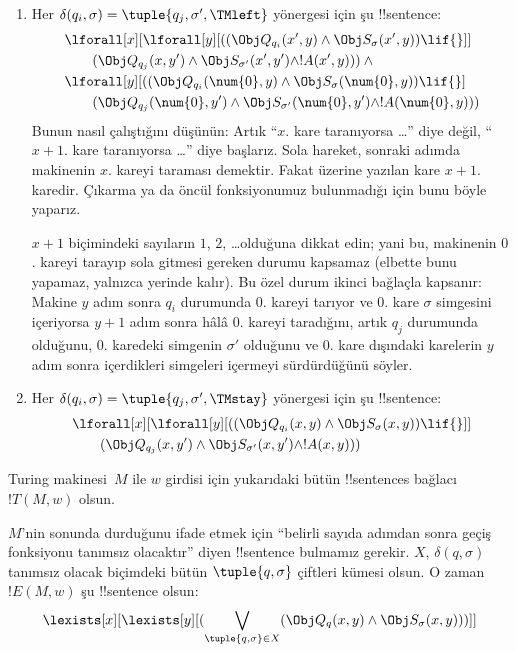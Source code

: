 \documentclass[../../../include/open-logic-section]{subfiles}
\begin{document}
\begin{enumerate}
\begin{enumerate}
\item {} Her
$\delta(q_i,\sigma)=\tuple{q_j,\sigma',\TMleft}$ yönergesi için şu
!!{sentence}:
\begin{align*}
& \lforall[x][\lforall[y][
    ((\Obj Q_{q_i}(x', y) \land \Obj S_{\sigma}(x', y)) \lif {}]]\\
& \qquad   (\Obj Q_{q_j}(x, y') \land \Obj S_{\sigma'}(x', y') \land
!A(x', y))) \land {}\\
& \lforall[y][((\Obj Q_{q_i}(\num{0}, y) \land \Obj S_{\sigma}(\num{0},
    y)) \lif {}]\\
& \qquad (\Obj Q_{q_j}(\num{0}, y') \land \Obj S_{\sigma'}(\num{0},
  y') \land !A(\num{0}, y)))
\end{align*}
Bunun nasıl çalıştığını düşünün: Artık ``$x$. kare taranıyorsa \dots'' diye
değil, ``$x+1$. kare taranıyorsa \dots'' diye başlarız. Sola hareket, sonraki
adımda makinenin $x$. kareyi taraması demektir. Fakat üzerine yazılan kare
$x+1$. karedir. Çıkarma ya da öncül fonksiyonumuz bulunmadığı için bunu böyle
yaparız.

$x+1$ biçimindeki sayıların $1$, $2$, \dots olduğuna dikkat edin; yani bu,
makinenin $0$. kareyi tarayıp sola gitmesi gereken durumu kapsamaz (elbette
bunu yapamaz, yalnızca yerinde kalır). Bu özel durum ikinci bağlaçla kapsanır:
Makine $y$ adım sonra $q_i$ durumunda $0$. kareyi tarıyor ve $0$. kare
$\sigma$ simgesini içeriyorsa $y+1$ adım sonra hâlâ $0$. kareyi taradığını,
artık $q_j$ durumunda olduğunu, $0$. karedeki simgenin $\sigma'$ olduğunu ve
$0$. kare dışındaki karelerin $y$ adım sonra içerdikleri simgeleri içermeyi
sürdürdüğünü söyler.
\item {} Her
$\delta(q_i,\sigma)=\tuple{q_j,\sigma',\TMstay}$ yönergesi için şu
!!{sentence}:
\begin{align*}
& \lforall[x][\lforall[y][(
   (\Obj Q_{q_i}(x, y) \land \Obj S_{\sigma}(x, y)) \lif {}]] \\
&\qquad   (\Obj Q_{q_j}(x, y') \land \Obj S_{\sigma'}(x, y') \land
!A(x, y)))
\end{align*}
\end{enumerate}
\end{enumerate}
Turing makinesi~$M$ ile $w$ girdisi için yukarıdaki bütün !!{sentence}s
bağlacı $!T(M,w)$ olsun.

$M$'nin sonunda durduğunu ifade etmek için ``belirli sayıda adımdan sonra
geçiş fonksiyonu tanımsız olacaktır'' diyen !!{sentence} bulmamız gerekir.
$X$, $\delta(q,\sigma)$ tanımsız olacak biçimdeki bütün
$\tuple{q,\sigma}$ çiftleri kümesi olsun. O zaman $!E(M,w)$ şu !!{sentence}
olsun:
\[
\lexists[x][\lexists[y][(\bigvee_{\tuple{q, \sigma} \in
      X}(\Obj Q_q(x, y) \land \Obj S_\sigma(x, y)))]]
\]
\end{document}
